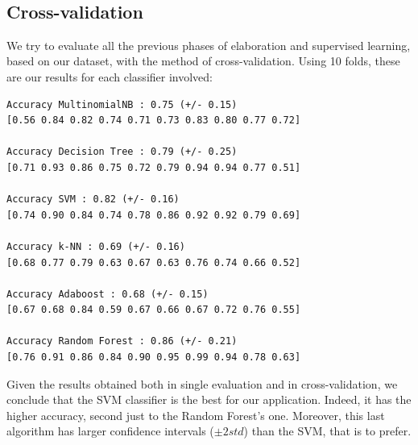 \documentclass[a4paper]{article}
\begin{document}
\begin{figure}[b]
 \\
\caption{}
\label{fig:confusion_matrices}
\end{figure}

\subsection{Cross-validation}
We try to evaluate all the previous phases of elaboration and supervised learning, based on our dataset, with the method of cross-validation. Using 10 folds, these are our results for each classifier involved:
\begin{verbatim}
Accuracy MultinomialNB : 0.75 (+/- 0.15)
[0.56 0.84 0.82 0.74 0.71 0.73 0.83 0.80 0.77 0.72]

Accuracy Decision Tree : 0.79 (+/- 0.25)
[0.71 0.93 0.86 0.75 0.72 0.79 0.94 0.94 0.77 0.51]

Accuracy SVM : 0.82 (+/- 0.16)
[0.74 0.90 0.84 0.74 0.78 0.86 0.92 0.92 0.79 0.69]

Accuracy k-NN : 0.69 (+/- 0.16)
[0.68 0.77 0.79 0.63 0.67 0.63 0.76 0.74 0.66 0.52]

Accuracy Adaboost : 0.68 (+/- 0.15)
[0.67 0.68 0.84 0.59 0.67 0.66 0.67 0.72 0.76 0.55]

Accuracy Random Forest : 0.86 (+/- 0.21)
[0.76 0.91 0.86 0.84 0.90 0.95 0.99 0.94 0.78 0.63]
\end{verbatim}

Given the results obtained both in single evaluation and in cross-validation, we conclude that the SVM classifier is the best for our application. Indeed, it has the higher accuracy, second just to the Random Forest's one. Moreover, this last algorithm has larger confidence intervals ($\pm 2std$) than the SVM, that is to prefer. 
\end{document}
